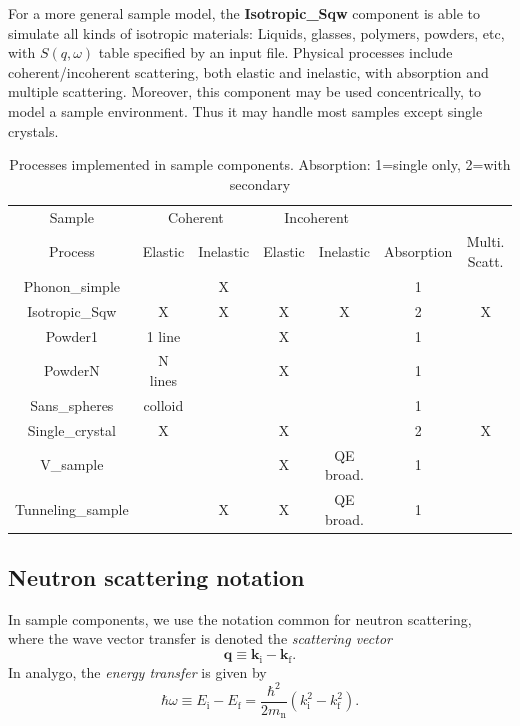 For a more general sample model, the \textbf{Isotropic\_Sqw} component
is able to simulate all kinds of isotropic materials:
Liquids, glasses, polymers, powders, etc, with $S(q,\omega)$ table
specified by an input file.
Physical processes include coherent/incoherent scattering,
both elastic and inelastic, with absorption and multiple scattering.
Moreover, this component may be used concentrically,
to model a sample environment.
Thus it may handle most samples except single crystals.

\begin{table}
  \begin{center}
  {\let\my=\\
    \begin{tabular}{|c|cc|cc|c|c|}
    \hline
    Sample        & \multicolumn{2}{c|}{Coherent} & \multicolumn{2}{c|}{Incoherent} &&\\
    Process       & Elastic & Inelastic & Elastic & Inelastic & Absorption & Multi. Scatt.\\
    \hline
    Phonon\_simple&         & X         &         &           & 1 & \\
    Isotropic\_Sqw&  X      & X         & X       & X         & 2 & X \\
    Powder1       &  1 line &           & X       &           & 1 & \\
    PowderN       &  N lines&           & X       &           & 1 & \\
    Sans\_spheres &  colloid&           &         &           & 1 & \\
    Single\_crystal& X      &           & X       &           & 2 & X \\
    V\_sample     &         &           & X       & QE broad. & 1 & \\
    Tunneling\_sample &     & X         & X       & QE broad. & 1 & \\
    \hline
    \end{tabular}
    \caption{Processes implemented in sample components. Absorption: 1=single only, 2=with secondary}
    \label{t:sample-process}
  }
  \end{center}
\end{table}
\subsection{Neutron scattering notation}
In sample components, we use the notation common for neutron scattering,
where the wave vector transfer is denoted the {\em scattering vector}
\begin{equation} \label{eq:q-transfer}
\textbf{q} \equiv \textbf{k}_\textrm{i} - \textbf{k}_\textrm{f} .
\end{equation}
In analygo, the {\em energy transfer} is given by
\begin{equation} \label{eq:w-transfer}
\hbar \omega \equiv E_\textrm{i} - E_\textrm{f} =
\frac{\hbar^2}{2 m_\textrm{n}} \left( k_\textrm{i}^2 - k_\textrm{f}^2 \right) .
\end{equation}


